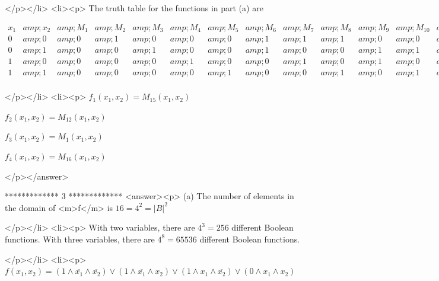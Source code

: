 </p></li>
<li><p>  The truth table for the functions in part (a) are

\begin{doublespace}
\noindent\(\begin{array}{llllllllllllllllll}
 x_1 &amp; x_2 &amp; M_1 &amp; M_2 &amp; M_3 &amp; M_4 &amp; M_5 &amp; M_6 &amp; M_7 &amp; M_8 &amp; M_9 &amp; M_{10} &amp; M_{11} &amp; M_{12} &amp; M_{13} &amp; M_{14} &amp; M_{15} &amp; M_{16} \\
 0 &amp; 0 &amp; 0 &amp; 1 &amp; 0 &amp; 0 &amp; 0 &amp; 1 &amp; 1 &amp; 1 &amp; 0 &amp; 0 &amp; 0 &amp; 1 &amp; 1 &amp; 1 &amp; 0 &amp; 1 \\
 0 &amp; 1 &amp; 0 &amp; 0 &amp; 1 &amp; 0 &amp; 0 &amp; 1 &amp; 0 &amp; 0 &amp; 1 &amp; 1 &amp; 0 &amp; 1 &amp; 1 &amp; 0 &amp; 1 &amp; 1 \\
 1 &amp; 0 &amp; 0 &amp; 0 &amp; 0 &amp; 1 &amp; 0 &amp; 0 &amp; 1 &amp; 0 &amp; 1 &amp; 0 &amp; 1 &amp; 1 &amp; 0 &amp; 1 &amp; 1 &amp; 1 \\
 1 &amp; 1 &amp; 0 &amp; 0 &amp; 0 &amp; 0 &amp; 1 &amp; 0 &amp; 0 &amp; 1 &amp; 0 &amp; 1 &amp; 1 &amp; 0 &amp; 1 &amp; 1 &amp; 1 &amp; 1 \\
\end{array}\)
\end{doublespace}

</p></li>
<li><p>        \(f_1\left(x_1,x_2\right)=M_{15}\left(x_1,x_2\right)\)



\(f_2\left(x_1,x_2\right)=M_{12}\left(x_1,x_2\right)\)



\(f_3\left(x_1,x_2\right)=M_1\left(x_1,x_2\right)\)



\(f_4\left(x_1,x_2\right)=M_{16}\left(x_1,x_2\right)\)

</p></answer>


*************
3
*************
<answer><p> (a) The number of elements in the domain of <m>f</m> is \(16=4^2=\left| B\right| ^2\)

</p></li>
<li><p> With two variables, there are \(4^3 = 256\) different Boolean functions. With three variables, there are \(4^8=65536\) different Boolean functions.

</p></li>
<li><p>     \(f\left(x_1,x_2\right)=\left(1\land \overline{x_1}\land \overline{x_2}\right)\lor \left(1\land \overline{x_1}\land x_2\right)\lor \left(1\land
x_1\land \overline{x_2}\right)\lor \left(0\land x_1\land x_2\right)\)

